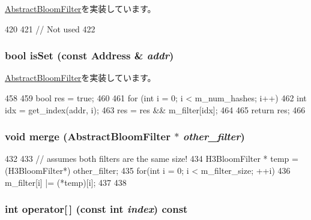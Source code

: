 \hyperlink{classAbstractBloomFilter_af795f7fdeff0174e914ed1d792ffe4ff}{AbstractBloomFilter}を実装しています。


\begin{DoxyCode}
420 {
421     // Not used
422 }
\end{DoxyCode}
\hypertarget{classH3BloomFilter_a4200ee289c3d941a4b209c4788f8087c}{
\subsubsection[{isSet}]{\setlength{\rightskip}{0pt plus 5cm}bool isSet (const {\bf Address} \& {\em addr})}}
\label{classH3BloomFilter_a4200ee289c3d941a4b209c4788f8087c}


\hyperlink{classAbstractBloomFilter_aa1b69d102655f8c5879b3df95eb205dc}{AbstractBloomFilter}を実装しています。


\begin{DoxyCode}
458 {
459     bool res = true;
460 
461     for (int i = 0; i < m_num_hashes; i++) {
462         int idx = get_index(addr, i);
463         res = res && m_filter[idx];
464     }
465     return res;
466 }
\end{DoxyCode}
\hypertarget{classH3BloomFilter_a4091f5f95de040d4e0ae5bd86817b13c}{
\subsubsection[{merge}]{\setlength{\rightskip}{0pt plus 5cm}void merge ({\bf AbstractBloomFilter} $\ast$ {\em other\_\-filter})}}
\label{classH3BloomFilter_a4091f5f95de040d4e0ae5bd86817b13c}



\begin{DoxyCode}
432 {
433     // assumes both filters are the same size!
434     H3BloomFilter * temp = (H3BloomFilter*) other_filter;
435     for(int i = 0; i < m_filter_size; ++i){
436         m_filter[i] |= (*temp)[i];
437     }
438 }
\end{DoxyCode}
\hypertarget{classH3BloomFilter_ad7ab71ad11e6bca06c3534af5707d8fc}{
\subsubsection[{operator[]}]{\setlength{\rightskip}{0pt plus 5cm}int operator\mbox{[}$\,$\mbox{]} (const int {\em index}) const}}
\label{classH3BloomFilter_ad7ab71ad11e6bca06c3534af5707d8fc}



